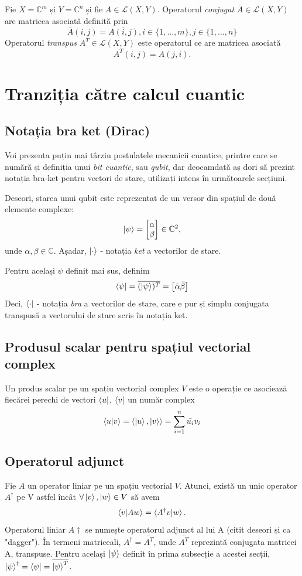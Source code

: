 Fie $X = \mathbb{C}^m$ și $Y = \mathbb{C}^n$ și fie $A \in \mathcal{L}(X,Y)$.
Operatorul \textit{conjugat} $\bar{A} \in \mathcal{L}(X, Y)$ are matricea asociată definită prin
\[
\bar{A}(i,j) = \overline{A(i,j)}, i \in \{1, ..., m\}, j \in \{1, ..., n\}
\]
Operatorul \textit{transpus} $A^T \in \mathcal{L}(X, Y)$ este operatorul ce are matricea asociată
\[
A^T(i,j) = A(j,i).
\]


\section{Tranziția către calcul cuantic}
\subsection{Notația bra ket (Dirac)}

Voi prezenta puțin mai târziu postulatele mecanicii cuantice, printre care se numără și definiția unui \textit{bit cuantic}, sau \textit{qubit}, dar deocamdată aș dori să prezint notația bra-ket pentru vectori de stare, utilizați intens în următoarele secțiuni. 

Deseori, starea unui qubit este reprezentat de un versor din spațiul de două elemente complexe:
\[
\ket{\psi} = \begin{bmatrix} \alpha \\ \beta \end{bmatrix} \in \mathbb{C}^2,
\]
unde $\alpha, \beta \in \mathbb{C}$. Așadar, $\ket{\cdot}$ - notația \textit{ket} a vectorilor de stare.

Pentru același $\psi$ definit mai sus, definim 
\[
\bra{\psi} = \overline{(\ket{\psi})^T} = \begin{bmatrix}
\bar{\alpha} \bar{\beta}
\end{bmatrix}
\]
Deci, $\bra{\cdot}$ - notația \textit{bra} a vectorilor de stare, care e pur și simplu conjugata transpusă a vectorului de stare scris în notația ket.

\subsection{Produsul scalar pentru spațiul vectorial complex}
Un produs scalar pe un spațiu vectorial complex $V$ este o operație ce asociează fiecărei perechi de vectori $\bra{u}$, $\bra{v}$ un număr complex
\[
\braket{u|v} = \braket{\ket{u}, \ket{v}} = \sum_{i=1}^{n} \bar{u_i}v_i
\]

\subsection{Operatorul adjunct}
Fie $A$ un operator liniar pe un spațiu vectorial $V$. Atunci, există un unic operator $A^\dagger$ pe V astfel încât $\forall \ket{v}, \ket{w} \in V$ să avem
\[
    \braket{v|Aw} = \braket{A^\dagger v | w}.
\]
Operatorul liniar $A\dagger$ se numește operatorul adjunct al lui A (citit deseori și ca "dagger").
În termeni matriceali, $A^\dagger = \overline{A^T}$, unde $\overline{A^T}$ reprezintă conjugata matricei A, transpuse.
Pentru același $\ket{\psi}$ definit în prima subsecție a acestei secții, $\ket{\psi}^\dagger = \bra{\psi} = \overline{\ket{\psi}^T}$.

